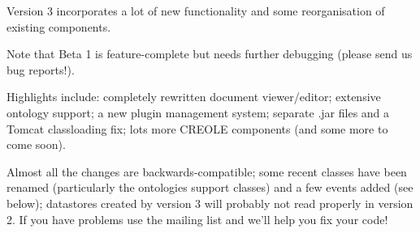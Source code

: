 
Version 3 incorporates a lot of new functionality and some reorganisation of
existing components.

Note that Beta 1 is feature-complete but needs further debugging (please
send us bug reports!).

Highlights include: completely rewritten document viewer/editor;
extensive ontology support; a new plugin management
system; separate .jar files and a Tomcat classloading fix; lots more CREOLE
components (and some more to come soon).

Almost all the changes are backwards-compatible; some recent classes have
been renamed (particularly the ontologies support classes) and a few events
added (see below); datastores created by version 3 will probably not read
properly in version 2.  If you have problems use the mailing list and we'll
help you fix your code!

